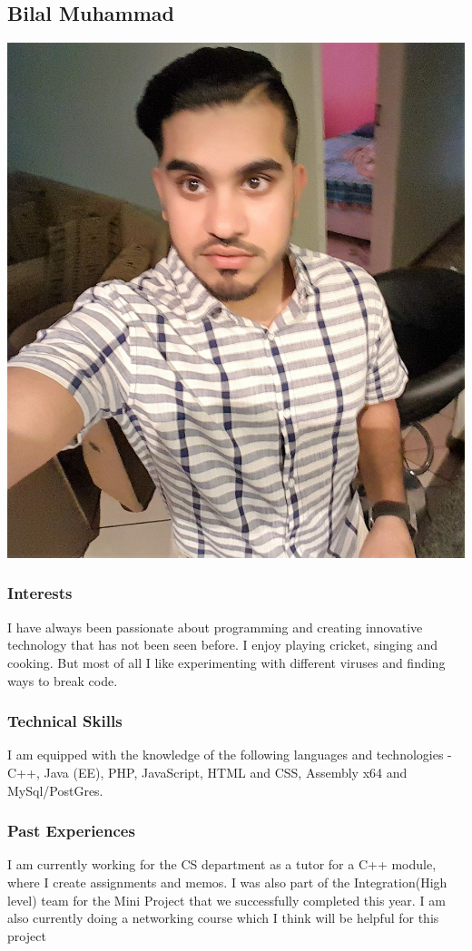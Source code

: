 \documentclass[a4paper,12pt]{article}
\begin{document}
		\subsection{Bilal Muhammad}
		\includegraphics[scale=0.2]{./Pictures/bilal.jpg}\\
			\subsubsection{Interests}
			I have always been passionate about programming and creating innovative technology that has not been seen before. I enjoy playing cricket, singing and cooking. But most of all I like experimenting with different viruses and finding ways to break code.
			\subsubsection{Technical Skills}
			I am equipped with the knowledge of the following languages and technologies - C++, Java (EE), PHP, JavaScript, HTML and CSS, Assembly x64 and MySql/PostGres.
			\subsubsection{Past Experiences}
			I am currently working for the CS department as a tutor for a C++ module, where I create assignments and memos. I was also part of the Integration(High level) team for the Mini Project that we successfully completed this year. I am also currently doing a networking course which I think will be helpful for this project  
\end{document}
